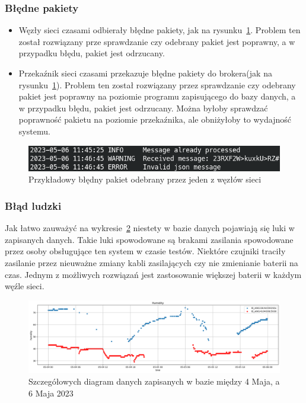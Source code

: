 \subsubsection{Błędne pakiety}
\begin{itemize}
    \item Węzły sieci czasami odbierały błędne pakiety, jak na rysunku~\ref{rys:zly-pakiet}. Problem ten został rozwiązany prze sprawdzanie czy odebrany pakiet jest poprawny, a w przypadku błędu, pakiet jest odrzucany.
    \item Przekaźnik sieci czasami przekazuje błędne pakiety do brokera(jak na rysunku~\ref{rys:zly-pakiet}). Problem ten został rozwiązany przez sprawdzanie czy odebrany pakiet jest poprawny na poziomie programu zapisującego do bazy danych, a w przypadku błędu, pakiet jest odrzucany. Można byłoby sprawdzać poprawność pakietu na poziomie przekaźnika, ale obniżyłoby to wydajność systemu.
\end{itemize}

\begin{figure}[b!]
    \begin{center}
        \includegraphics[width=13cm]{pic/zly-pakiet.png}
    \end{center}
    \caption{Przykładowy błędny pakiet odebrany przez jeden z węzłów sieci}\label{rys:zly-pakiet}
\end{figure}

\subsubsection{Błąd ludzki}
Jak łatwo zauważyć na wykresie~\ref{rys:diagram-scat} niestety w bazie danych pojawiają się luki w zapisanych danych. Takie luki spowodowane są brakami zasilania spowodowane przez osoby obsługujące ten system w czasie testów. Niektóre czujniki traciły zasilanie przez nieuważne zmiany kabli zasilających czy nie zmienianie baterii na czas. Jednym z możliwych rozwiązań jest zastosowanie większej baterii w każdym węźle sieci.

\begin{figure}[b!]
    \begin{center}
        \includegraphics[width=13cm]{pic/diagram-scat-humm.png}
    \end{center}
    \caption{Szczegółowych diagram danych zapisanych w bazie między 4 Maja, a 6 Maja 2023}\label{rys:diagram-scat}
\end{figure}

